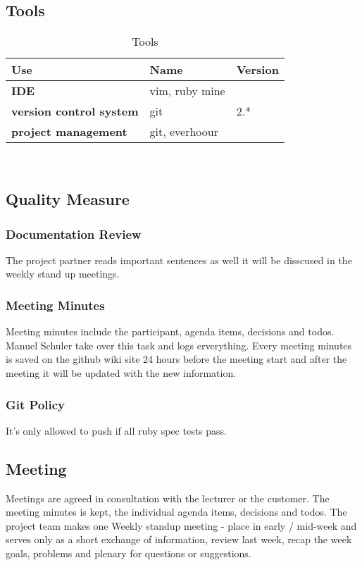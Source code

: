 \subsection{Tools}
\begin{table}[H]
  \centering
  \scriptsize
  \caption{Tools}
  \begin{tabular}{|p{50mm}|p{15mm}|p{15mm}|}
    \hline 	\bf Use & Name & Version \\ \hline
	\bf IDE & vim, ruby mine &  \\ \hline
	\bf version control system & git & 2.* \\ \hline
	\bf project management  & git, everhoour &  \\ \hline
  \end{tabular} \\
\end{table}

\subsection{Quality Measure}

\subsubsection{Documentation Review}
The project partner reads important sentences as well it will be disscused in the weekly stand up meetings.


\subsubsection{Meeting Minutes}
Meeting minutes include the participant, agenda items, decisions and todos. Manuel Schuler take over this task and logs erverything.
Every meeting minutes is saved on the github wiki site 24 hours before the meeting start and after the meeting it will be updated with the new information.

\subsubsection{Git Policy}
It's only allowed to push if all ruby spec tests pass.


\subsection{Meeting}
Meetings are agreed in consultation with the lecturer or the customer. 
The meeting minutes is kept, the individual agenda items, decisions and todos.
The project team makes one Weekly standup meeting - place in early / mid-week and serves only as a short exchange of information, 
review last week, recap the week goals, problems and plenary for questions or suggestions.


